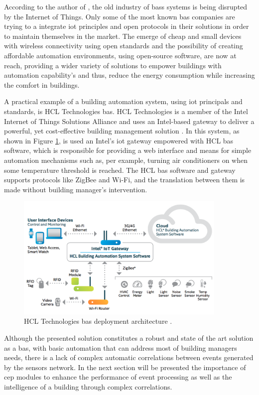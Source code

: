According to the author of \cite{TransformativeWave}, the old industry of \ac{bas}s systems is being disrupted by the Internet of Things. Only some of the most known \ac{bas} companies are trying to a integrate \ac{iot} principles and open protocols in their solutions in order to maintain themselves in the market. The emerge of cheap and small devices with wireless connectivity using open standards and the possibility of creating affordable automation environments, using open-source software, are now at reach, providing a wider variety of solutions to empower buildings with automation capability's and thus, reduce the energy consumption while increasing the comfort in buildings.

A practical example of a building automation system, using \ac{iot} principals and standards, is HCL Technologies \ac{bas}. HCL Technologies is a member of the Intel Internet of Things Solutions Alliance \cite{intel} and uses an Intel-based gateway to deliver a powerful, yet cost-effective building management solution \cite{hcl}. In this system, as shown in Figure \ref{fig:intel}, is used an Intel's \ac{iot} gateway empowered with HCL \ac{bas} software, which is responsible for providing a web interface and means for simple automation mechanisms such as, per example, turning air conditioners on when some temperature threshold is reached. The HCL \ac{bas} software and gateway supports protocols like ZigBee and Wi-Fi, and the translation between them is made without building manager's intervention.


\begin{figure}[H]
	\centering
	\includegraphics[width=0.9\textwidth]{figures/intelhclarch.png}
	\caption{HCL Technologies \ac{bas} deployment architecture \cite{hcl}.}
	\label{fig:intel}
\end{figure}

Although the presented solution constitutes a robust and state of the art solution as a \ac{bas}, with basic automation that can address most of building managers needs, there is a lack of complex automatic correlations between events generated by the sensors network. In the next section will be presented the importance of \acf{cep} modules to enhance the performance of event processing as well as the intelligence of a building through complex correlations.


